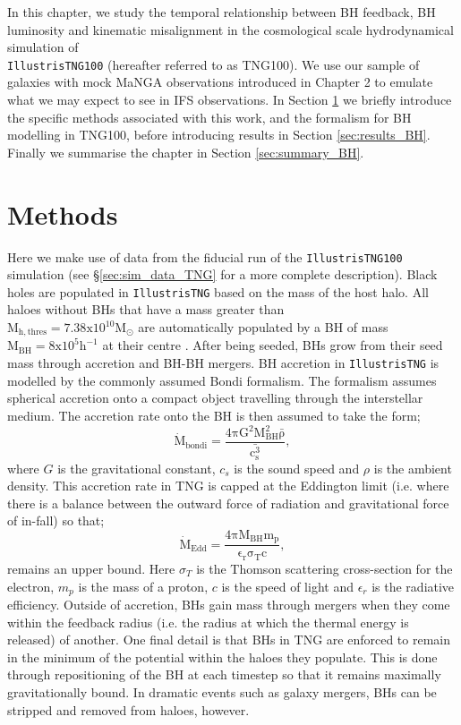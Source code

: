 In this chapter, we study the temporal relationship between BH feedback, BH luminosity and kinematic misalignment in the cosmological scale hydrodynamical simulation of 
\\
\texttt{IllustrisTNG100}  (hereafter referred to as TNG100). We use our sample of galaxies with mock MaNGA observations introduced in Chapter 2 to emulate what we may expect to see in IFS observations. In Section \ref{sec:methods_BH} we briefly introduce the specific methods associated with this work, and the formalism for BH modelling in TNG100, before introducing results in Section \ref{sec:results_BH}. Finally we summarise the chapter in Section \ref{sec:summary_BH}.

\section{Methods} \label{sec:methods_BH}
Here we make use of data from the fiducial run of the \texttt{IllustrisTNG100}  simulation (see \S\ref{sec:sim_data_TNG} for a more complete description). Black holes are populated in \texttt{IllustrisTNG}  based on the mass of the host halo. All haloes without BHs that have a mass greater than 
\\
$\mathrm{M_{h,thres} = 7.38 x 10^{10} M_{\odot} }$ are automatically populated by a BH of mass $\mathrm{M_{BH} = 8 x 10^{5} h^{-1}}$ at their centre \citep[termed halo-based BH formation, see also;][]{sijacki2009, dimatteo2012, hirschmann2014, sijacki2015}. After being seeded, BHs grow from their seed mass through accretion and BH-BH mergers. BH accretion in \texttt{IllustrisTNG}  is modelled by the commonly assumed Bondi formalism. The formalism assumes spherical accretion onto a compact object travelling through the interstellar medium. The accretion rate onto the BH is then assumed to take the form;
\begin{equation}
\mathrm{\dot{M}_{bondi} = \frac{4\pi G^{2} M_{BH}^{2} \bar{\rho}}{\bar{c^{3}_{s}}}},
\end{equation}
where $G$ is the gravitational constant, $c_{s}$ is the sound speed and $\rho$ is the ambient density. This accretion rate in TNG is capped at the Eddington limit (i.e. where there is a balance between the outward force of radiation and gravitational force of in-fall) so that;
\begin{equation}
\mathrm{\dot{M}_{Edd} = \frac{4\pi M_{BH} m_p}{\epsilon_r \sigma_T c} },
\end{equation}
remains an upper bound. Here $\sigma_T$ is the Thomson scattering cross-section for the electron, $m_p$ is the mass of a proton, $c$ is the speed of light and $\epsilon_r$ is the radiative efficiency. Outside of accretion, BHs gain mass through mergers when they come within the feedback radius (i.e. the radius at which the thermal energy is released) of another. One final detail is that BHs in TNG are enforced to remain in the minimum of the potential within the haloes they populate. This is done through repositioning of the BH at each timestep so that it remains maximally gravitationally bound. In dramatic events such as galaxy mergers, BHs can be stripped and removed from haloes, however. 

